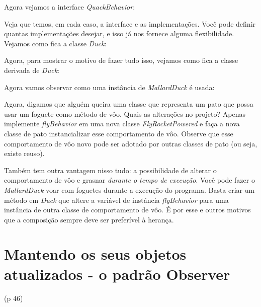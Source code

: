 \documentclass[a4paper,11pt]{report}
\begin{document}

Agora vejamos a interface \textit{QuackBehavior}:\\


Veja que temos, em cada caso, a interface e as implementações. Você pode definir quantas implementações desejar, e isso já nos fornece alguma flexibilidade. Vejamos como fica a classe \textit{Duck}:


Agora, para mostrar o motivo de fazer tudo isso, vejamos como fica a classe derivada de \textit{Duck}:\\


Agora vamos observar como uma instância de \textit{MallardDuck} é usada:\\


Agora, digamos que alguém queira uma classe que representa um pato que possa usar um foguete como método de vôo. Quais as alterações no projeto? Apenas implemente \textit{flyBehavior} em uma nova classe \textit{FlyRocketPowered} e faça a nova classe de pato instancializar esse comportamento de vôo. Observe que esse comportamento de vôo novo pode ser adotado por outras classes de pato (ou seja, existe reuso).

Também tem outra vantagem nisso tudo: a possibilidade de alterar o comportamento de vôo e grasnar \textit{durante o tempo de execução}. Você pode fazer o \textit{MallardDuck} voar com foguetes durante a execução do programa. Basta criar um método em \textit{Duck} que altere a variável de instância \textit{flyBehavior} para uma instância de outra classe de comportamento de vôo. É por esse e outros motivos que a composição sempre deve ser preferível à herança.

\chapter{Mantendo os seus objetos atualizados - o padrão Observer}
\label{chap:observer}

(p 46)
\end{document}
